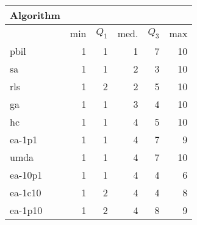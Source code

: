 \begin{tabular}{@{} l *{5}{>{{}}n{2}{0}} @{}}
\toprule
{Algorithm} &  \\
\midrule
& {min} & {$Q_1$} & {med.} & {$Q_3$} & {max} \\
\midrule
pbil & 1 & 1 & 1 & 7 & 10 \\
sa & 1 & 1 & 2 & 3 & 10 \\
rls & 1 & 2 & 2 & 5 & 10 \\
ga & 1 & 1 & 3 & 4 & 10 \\
hc & 1 & 1 & 4 & 5 & 10 \\
ea-1p1 & 1 & 1 & 4 & 7 & 9 \\
umda & 1 & 1 & 4 & 7 & 10 \\
ea-10p1 & 1 & 1 & 4 & 4 & 6 \\
ea-1c10 & 1 & 2 & 4 & 4 & 8 \\
ea-1p10 & 1 & 2 & 4 & 8 & 9 \\
\bottomrule
\end{tabular}
